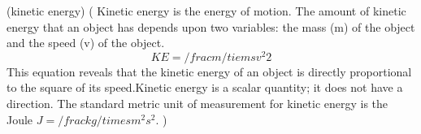 \newglossaryentry(kinetic energy)
(
Kinetic energy is the energy of motion. The amount of kinetic energy that an object has depends upon two variables: the mass (m) of the object and the speed (v) of the object. 
$$KE=/frac{m/tiemsv^2}{2}$$
This equation reveals that the kinetic energy of an object is directly proportional to the square of its speed.Kinetic energy is a scalar quantity; it does not have a direction. The standard metric unit of measurement for kinetic energy is the Joule $J=/frac{kg/timesm^2}{s^2}$. 
     )
